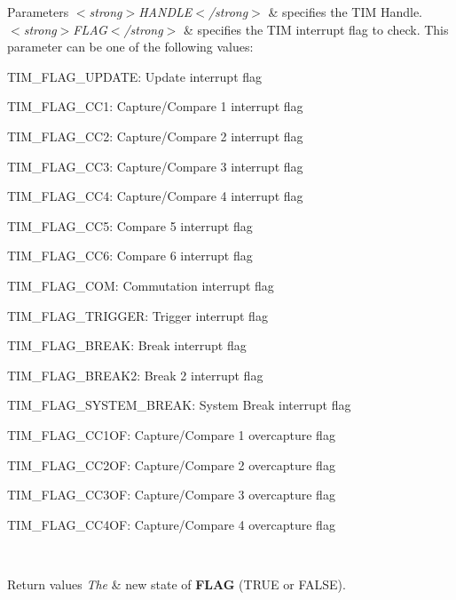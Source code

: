 \begin{DoxyParams}{Parameters}
{\em $<$strong$>$\+H\+A\+N\+D\+L\+E$<$/strong$>$} & specifies the T\+IM Handle. \\
\hline
{\em $<$strong$>$\+F\+L\+A\+G$<$/strong$>$} & specifies the T\+IM interrupt flag to check. This parameter can be one of the following values\+: \begin{DoxyItemize}
\item T\+I\+M\+\_\+\+F\+L\+A\+G\+\_\+\+U\+P\+D\+A\+TE\+: Update interrupt flag \item T\+I\+M\+\_\+\+F\+L\+A\+G\+\_\+\+C\+C1\+: Capture/\+Compare 1 interrupt flag \item T\+I\+M\+\_\+\+F\+L\+A\+G\+\_\+\+C\+C2\+: Capture/\+Compare 2 interrupt flag \item T\+I\+M\+\_\+\+F\+L\+A\+G\+\_\+\+C\+C3\+: Capture/\+Compare 3 interrupt flag \item T\+I\+M\+\_\+\+F\+L\+A\+G\+\_\+\+C\+C4\+: Capture/\+Compare 4 interrupt flag \item T\+I\+M\+\_\+\+F\+L\+A\+G\+\_\+\+C\+C5\+: Compare 5 interrupt flag \item T\+I\+M\+\_\+\+F\+L\+A\+G\+\_\+\+C\+C6\+: Compare 6 interrupt flag \item T\+I\+M\+\_\+\+F\+L\+A\+G\+\_\+\+C\+OM\+: Commutation interrupt flag \item T\+I\+M\+\_\+\+F\+L\+A\+G\+\_\+\+T\+R\+I\+G\+G\+ER\+: Trigger interrupt flag \item T\+I\+M\+\_\+\+F\+L\+A\+G\+\_\+\+B\+R\+E\+AK\+: Break interrupt flag \item T\+I\+M\+\_\+\+F\+L\+A\+G\+\_\+\+B\+R\+E\+A\+K2\+: Break 2 interrupt flag \item T\+I\+M\+\_\+\+F\+L\+A\+G\+\_\+\+S\+Y\+S\+T\+E\+M\+\_\+\+B\+R\+E\+AK\+: System Break interrupt flag \item T\+I\+M\+\_\+\+F\+L\+A\+G\+\_\+\+C\+C1\+OF\+: Capture/\+Compare 1 overcapture flag \item T\+I\+M\+\_\+\+F\+L\+A\+G\+\_\+\+C\+C2\+OF\+: Capture/\+Compare 2 overcapture flag \item T\+I\+M\+\_\+\+F\+L\+A\+G\+\_\+\+C\+C3\+OF\+: Capture/\+Compare 3 overcapture flag \item T\+I\+M\+\_\+\+F\+L\+A\+G\+\_\+\+C\+C4\+OF\+: Capture/\+Compare 4 overcapture flag \end{DoxyItemize}
\\
\hline
\end{DoxyParams}

\begin{DoxyRetVals}{Return values}
{\em The} & new state of {\bfseries{F\+L\+AG}} (T\+R\+UE or F\+A\+L\+SE). \\
\hline
\end{DoxyRetVals}
\mbox{\label{group___t_i_m___exported___macros_gabfeec6b3c67a5747c7dbd20aff61d8e2}} 
